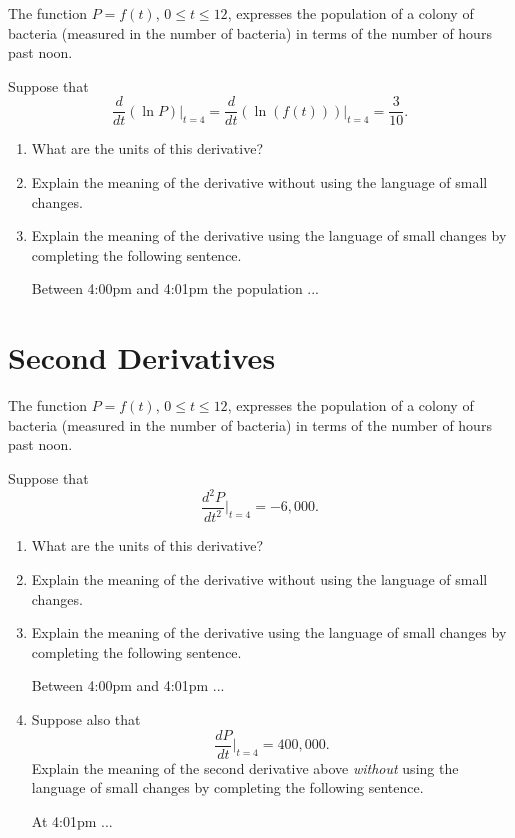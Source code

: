 \documentclass{ximera}
\begin{document}
\begin{question}  \label{Q5ghldfdfgng}
The function $P=f(t)$, $0\leq t \leq 12$, expresses the population of a colony of bacteria (measured in the number of bacteria) in terms of the number of hours past noon.

Suppose that
\[
   \frac{d}{dt} \left(  \ln P \right)\Big|_{t=4} = \frac{d}{dt} \left(  \ln (f(t)) \right)\Big|_{t=4}  = \frac{3}{10} .
\]

\begin{enumerate}
\item What are the units of this derivative?

\item Explain the meaning of the derivative without using the language of small changes.

\item Explain the meaning of the derivative using the language of small changes by completing the following sentence.

Between 4:00pm and 4:01pm the population ...
\end{enumerate}
\end{question}



\section{Second Derivatives}

\begin{question} \label{Q59dfgnmnmcxcv}
The function $P=f(t)$, $0\leq t \leq 12$, expresses the population of a colony of bacteria (measured in the number of bacteria) in terms of the number of hours past noon.

Suppose that
\begin{equation}
   \frac{d^2 P}{dt^2} \Big|_{t=4} =  -6,000 .  %
\end{equation}


\begin{enumerate}
\item What are the units of this derivative?

\item Explain the meaning of the derivative without using the language of small changes.

\item Explain the meaning of the derivative using the language of small changes by completing the following sentence.

Between 4:00pm and 4:01pm  ...

\item Suppose also that
\[
   \frac{dP}{dt}\Big|_{t=4} = 400,000 .
\]
Explain the meaning of the second derivative above \emph{without} using the language of small changes by completing the following sentence.

At 4:01pm  ...

\end{enumerate}
\end{question}
\end{document}
